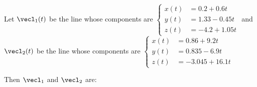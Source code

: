 \documentclass{ximera}
\author{Gregory Hartman \and Matthew Carr}
\begin{document}
\begin{exercise}
Let $\vecl_{1}(t)$ be the line whose components are $\left\{ \begin{aligned}
x(t) & =0.2+0.6t\\
y(t) & =1.33-0.45t\\
z(t) & =-4.2+1.05t
\end{aligned}
\right.$  and $\vecl_{2}(t)$ be the line whose components are $\left\{ \begin{aligned}
x(t) & =0.86+9.2t\\
y(t) & =0.835-6.9t\\
z(t) & =-3.045+16.1t
\end{aligned}
\right.$

Then $\vecl_{1}$ and $\vecl_{2}$ are: 

\begin{multipleChoice}
\end{multipleChoice}


\end{exercise}
\end{document}
